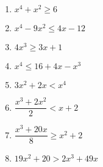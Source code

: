 \documentclass[12pt]{article}
\theoremstyle{definition}
\begin{document}
\begin{multicols}{2}
\begin{enumerate}
 \item $x^4 + x^2 \geq 6$\\
 \item $x^{4} - 9x^{2} \leq 4x - 12$\\
 \item $4x^3 \geq 3x+1$\\
 \item $x^4 \leq 16+4x-x^3$\\
 \item $3x^2 + 2x < x^4$\\
 \item $\dfrac{x^3+2 x^2}{2} < x+2$\\
 \item $\dfrac{x^3+20x}{8} \geq x^2 + 2$\\
 \item $19x^{2} + 20 > 2x^{3} + 49x $
\end{enumerate}
\end{multicols}
\newpage
\ \newpage
\end{document}
